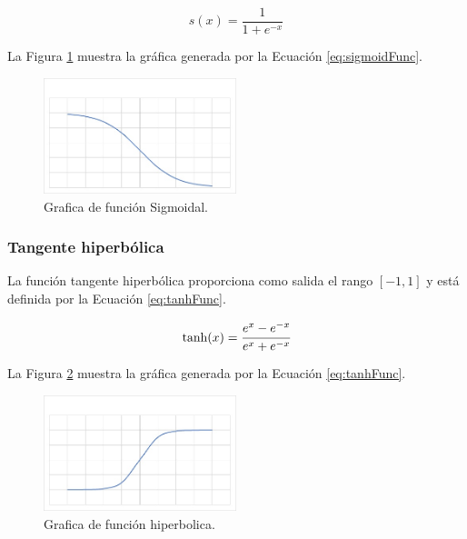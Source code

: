 \begin{equation}
\label{eq:sigmoidFunc}
    s(x)={\frac {1}{1+e^{-x}}}
\end{equation}

La Figura \ref{fig:graficaSigmoidal} muestra la gráfica generada por la Ecuación \ref{eq:sigmoidFunc}.

\begin{figure}[H]
    \centering
    \includegraphics[width=0.5\textwidth]{MarcoTeorico/imgs/GraficaSigmoidal.jpg}
    \caption{Grafica de función Sigmoidal.}
    \label{fig:graficaSigmoidal}
\end{figure}

\subsubsection{Tangente hiperbólica}

La función tangente hiperbólica proporciona como salida el rango $[-1,1]$ y está definida por la Ecuación \ref{eq:tanhFunc}.

\begin{equation}
\label{eq:tanhFunc}
    \tanh (x)={\cfrac {e^{x}-e^{-x}}{e^{x}+e^{-x}}}
\end{equation}

La Figura \ref{fig:graficaHiperbolica} muestra la gráfica generada por la Ecuación \ref{eq:tanhFunc}.

\begin{figure}[H]
    \centering
    \includegraphics[width=0.5\textwidth]{MarcoTeorico/imgs/GraficaHiperbolica.jpg}
    \caption{Grafica de función hiperbolica.}
    \label{fig:graficaHiperbolica}
\end{figure}


